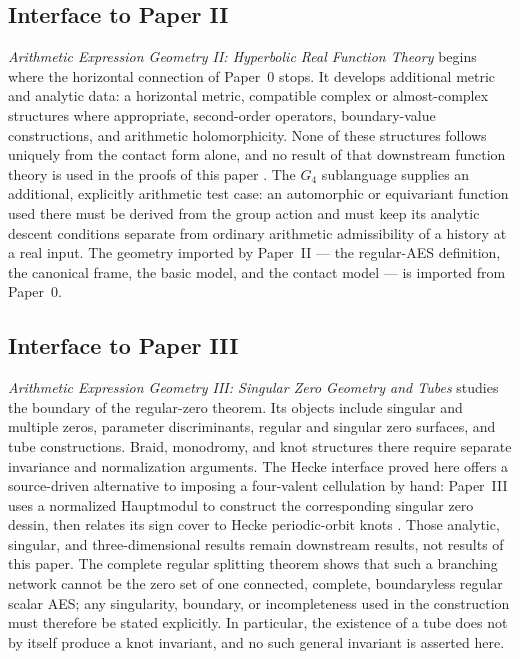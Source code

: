 \subsection{Interface to Paper II}

\emph{Arithmetic Expression Geometry II: Hyperbolic Real Function Theory}
begins where the horizontal connection of Paper~0 stops.  It develops additional
metric and analytic data: a horizontal metric, compatible complex or
almost-complex structures where appropriate, second-order operators,
boundary-value constructions, and arithmetic holomorphicity.  None of these
structures follows uniquely from the contact form alone, and no result of that
downstream function theory is used in the proofs of this paper
\cite{Yuan2026AEGFunctionTheory}.  The $G_4$ sublanguage supplies an additional,
explicitly arithmetic test case: an automorphic or equivariant function used
there must be derived from the group action and must keep its analytic descent
conditions separate from ordinary arithmetic admissibility of a history at a
real input.  The geometry imported by Paper~II --- the regular-AES definition,
the canonical frame, the basic model, and the contact model --- is imported from
Paper~0.

\subsection{Interface to Paper III}

\emph{Arithmetic Expression Geometry III: Singular Zero Geometry and Tubes}
studies the boundary of the regular-zero theorem.  Its objects include singular
and multiple zeros, parameter discriminants, regular and singular zero surfaces,
and tube constructions.  Braid, monodromy, and knot structures there require
separate invariance and normalization arguments.  The Hecke interface proved
here offers a source-driven alternative to imposing a four-valent cellulation by
hand: Paper~III uses a normalized Hauptmodul to construct the corresponding
singular zero dessin, then relates its sign cover to Hecke periodic-orbit knots
\cite{Yuan2026AEGZeroGeometry}.  Those analytic, singular, and three-dimensional
results remain downstream results, not results of this paper.  The complete
regular splitting theorem shows that such a branching network cannot be the zero
set of one connected, complete, boundaryless regular scalar AES; any
singularity, boundary, or incompleteness used in the construction must therefore
be stated explicitly.  In particular, the existence of a tube does not by itself
produce a knot invariant, and no such general invariant is asserted here.

